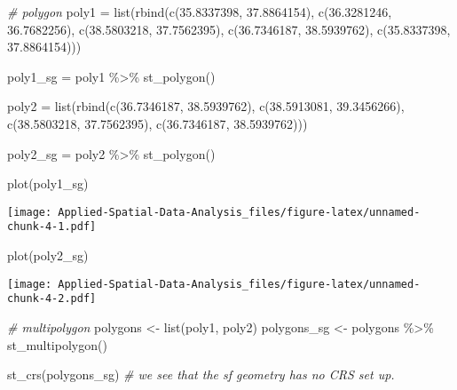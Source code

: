 \documentclass[
]{book}
\newenvironment{Shaded}{\begin{snugshade}}{\end{snugshade}}
\newcommand{\CommentTok}[1]{\textcolor[rgb]{0.56,0.35,0.01}{\textit{#1}}}
\newcommand{\FloatTok}[1]{\textcolor[rgb]{0.00,0.00,0.81}{#1}}
\newcommand{\FunctionTok}[1]{\textcolor[rgb]{0.00,0.00,0.00}{#1}}
\newcommand{\NormalTok}[1]{#1}
\newcommand{\OtherTok}[1]{\textcolor[rgb]{0.56,0.35,0.01}{#1}}
\newcommand{\SpecialCharTok}[1]{\textcolor[rgb]{0.00,0.00,0.00}{#1}}
\begin{document}
\begin{Shaded}
\begin{Highlighting}[]
\CommentTok{\# polygon}
\NormalTok{poly1 }\OtherTok{=} \FunctionTok{list}\NormalTok{(}\FunctionTok{rbind}\NormalTok{(}\FunctionTok{c}\NormalTok{(}\FloatTok{35.8337398}\NormalTok{, }\FloatTok{37.8864154}\NormalTok{), }
                   \FunctionTok{c}\NormalTok{(}\FloatTok{36.3281246}\NormalTok{, }\FloatTok{36.7682256}\NormalTok{),}
                   \FunctionTok{c}\NormalTok{(}\FloatTok{38.5803218}\NormalTok{, }\FloatTok{37.7562395}\NormalTok{), }
                   \FunctionTok{c}\NormalTok{(}\FloatTok{36.7346187}\NormalTok{, }\FloatTok{38.5939762}\NormalTok{),}
                   \FunctionTok{c}\NormalTok{(}\FloatTok{35.8337398}\NormalTok{, }\FloatTok{37.8864154}\NormalTok{))) }

\NormalTok{poly1\_sg }\OtherTok{=}\NormalTok{ poly1 }\SpecialCharTok{\%\textgreater{}\%} \FunctionTok{st\_polygon}\NormalTok{()}

\NormalTok{poly2 }\OtherTok{=} \FunctionTok{list}\NormalTok{(}\FunctionTok{rbind}\NormalTok{(}\FunctionTok{c}\NormalTok{(}\FloatTok{36.7346187}\NormalTok{, }\FloatTok{38.5939762}\NormalTok{), }
                   \FunctionTok{c}\NormalTok{(}\FloatTok{38.5913081}\NormalTok{, }\FloatTok{39.3456266}\NormalTok{),}
                   \FunctionTok{c}\NormalTok{(}\FloatTok{38.5803218}\NormalTok{, }\FloatTok{37.7562395}\NormalTok{), }
                   \FunctionTok{c}\NormalTok{(}\FloatTok{36.7346187}\NormalTok{, }\FloatTok{38.5939762}\NormalTok{)))}

\NormalTok{poly2\_sg }\OtherTok{=}\NormalTok{ poly2 }\SpecialCharTok{\%\textgreater{}\%} \FunctionTok{st\_polygon}\NormalTok{()}

\FunctionTok{plot}\NormalTok{(poly1\_sg)}
\end{Highlighting}
\end{Shaded}

\texttt{[image: Applied-Spatial-Data-Analysis\_files/figure-latex/unnamed-chunk-4-1.pdf]}

\begin{Shaded}
\begin{Highlighting}[]
\FunctionTok{plot}\NormalTok{(poly2\_sg)}
\end{Highlighting}
\end{Shaded}

\texttt{[image: Applied-Spatial-Data-Analysis\_files/figure-latex/unnamed-chunk-4-2.pdf]}

\begin{Shaded}
\begin{Highlighting}[]
\CommentTok{\# multipolygon}
\NormalTok{polygons }\OtherTok{\textless{}{-}} \FunctionTok{list}\NormalTok{(poly1, poly2)}
\NormalTok{polygons\_sg }\OtherTok{\textless{}{-}}\NormalTok{ polygons }\SpecialCharTok{\%\textgreater{}\%} \FunctionTok{st\_multipolygon}\NormalTok{()}

\FunctionTok{st\_crs}\NormalTok{(polygons\_sg) }\CommentTok{\# we see that the sf geometry has no CRS set up.}
\end{Highlighting}
\end{Shaded}
\end{document}
